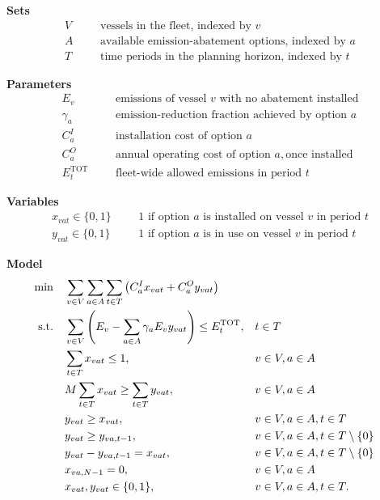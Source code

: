 \medskip
\noindent\textbf{Sets}
\begin{align*}
  V & &&\text{vessels in the fleet, indexed by } v \\
  A & &&\text{available emission-abatement options, indexed by } a \\
  T & &&\text{time periods in the planning horizon, indexed by } t
\end{align*}

\noindent\textbf{Parameters}
\begin{align*}
  E_v & &&\text{emissions of vessel } v \text{ with no abatement installed} \\
  \gamma_a & &&\text{emission-reduction fraction achieved by option } a \\
  C_a^I & &&\text{installation cost of option } a \\
  C_a^O & &&\text{annual operating cost of option } a, \text{once installed} \\
  E_t^{\text{TOT}} & &&\text{fleet-wide allowed emissions in period } t
\end{align*}

\noindent\textbf{Variables}
\begin{align*}
  x_{vat}\in\{0,1\} & &&1 \text{ if option } a \text{ is installed on vessel } v \text{ in period } t \\
  y_{vat}\in\{0,1\} & &&1 \text{ if option } a \text{ is in use on vessel } v \text{ in period } t
\end{align*}

\noindent\textbf{Model}
\begin{align}
  \min \quad & \sum_{v\in V}\sum_{a\in A}\sum_{t\in T} \left(C_a^I x_{vat} + C_a^O y_{vat}\right) \label{eq:fleet-obj}\\
  \text{s.t.} \quad
  & \sum_{v\in V}\left(E_v - \sum_{a\in A}\gamma_a E_v y_{vat}\right) \leq E_t^{\text{TOT}}, && t \in T \label{eq:fleet-c1}\\
  & \sum_{t\in T} x_{vat} \leq 1, && v\in V, a\in A \label{eq:fleet-c2}\\
  & M\sum_{t\in T}x_{vat} \geq \sum_{t\in T}y_{vat}, && v\in V, a\in A \label{eq:fleet-c3}\\
  & y_{vat} \geq x_{vat}, && v\in V, a\in A, t\in T \label{eq:fleet-c4}\\
  & y_{vat} \geq y_{va,t-1}, && v\in V, a\in A, t\in T\setminus\{0\} \label{eq:fleet-c5}\\
  & y_{vat} - y_{va,t-1} = x_{vat}, && v\in V, a\in A, t\in T\setminus\{0\} \label{eq:fleet-c6}\\
  & x_{va,N-1} = 0, && v\in V, a\in A \label{eq:fleet-c7}\\
  & x_{vat}, y_{vat} \in \{0,1\}, && v\in V, a\in A, t\in T. \notag
\end{align}

